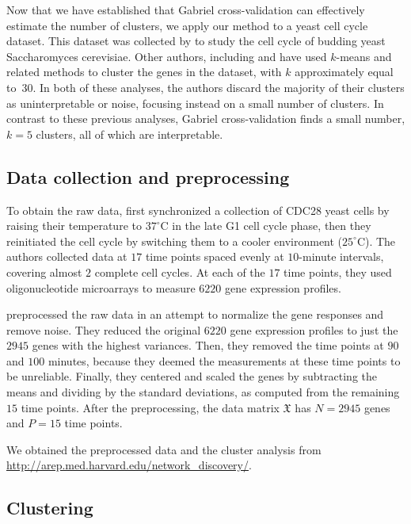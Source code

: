 \documentclass[12pt]{article}
\newcommand{\dataX}{\mathfrak{X}}
\begin{document}
Now that we have established that Gabriel cross-validation can effectively
estimate the number of clusters, we apply our method to a yeast cell cycle
dataset. This dataset was collected by \cite{cho1998genome} to study the cell
cycle of budding yeast Saccharomyces cerevisiae. Other authors, including
\citet{tavazoie1999systematic} and \citet{dortet2008model} have used $k$-means
and related methods to cluster the genes in the dataset, with $k$
approximately equal to~30. In both of these analyses, the authors discard the
majority of their clusters as uninterpretable or noise, focusing instead on a
small number of clusters. In contrast to these previous analyses, Gabriel
cross-validation finds a small number, $k = 5$ clusters, all of which are
interpretable.


\subsection{Data collection and preprocessing}

To obtain the raw data, \citet{cho1998genome} first synchronized a collection
of CDC28 yeast cells by raising their temperature to $37^\circ$C in the late
G1 cell cycle phase, then they reinitiated the cell cycle by switching them to
a cooler environment ($25^\circ$C). The authors collected data at $17$ time
points spaced evenly at $10$-minute intervals, covering almost $2$ complete
cell cycles. At each of the $17$ time points, they used
oligonucleotide microarrays to measure $6220$ gene expression profiles.


\citet{tavazoie1999systematic} preprocessed the raw data in an attempt to
normalize the gene responses and remove noise. They reduced the original
$6220$ gene expression profiles to just the $2945$ genes with the highest
variances. Then, they removed the time points at $90$ and $100$ minutes,
because they deemed the measurements at these time points to be unreliable.
Finally, they centered and scaled the genes by subtracting the means and
dividing by the standard deviations, as computed from the remaining $15$ time
points.  After the preprocessing, the data matrix $\dataX$ has $N = 2945$
genes and $P = 15$ time points.

We obtained the preprocessed data and the \citet{tavazoie1999systematic}
cluster analysis from \url{http://arep.med.harvard.edu/network_discovery/}.


\subsection{Clustering}
\end{document}
